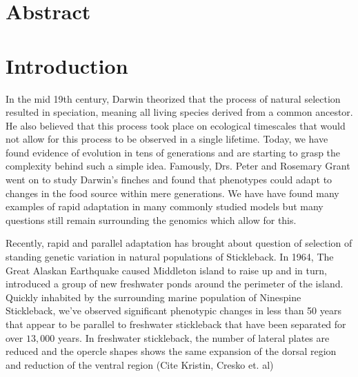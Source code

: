 \documentclass{article}
\begin{document}
\linespread{1.5}


\section{Abstract}









\section{Introduction}


In the mid 19th century,
Darwin theorized that the process of natural selection resulted in speciation, 
meaning all living species derived from a common ancestor. 
He also believed that this process took place on ecological timescales that would not allow for 
this process to be observed in a single lifetime. 
Today, we have found evidence of evolution
in tens of generations and are starting to grasp the complexity behind such a simple idea. 
Famously, Drs. Peter and Rosemary Grant went on to study Darwin's finches and
found that phenotypes could adapt to changes in the food source within mere generations.
We have have found many examples of rapid adaptation in many commonly studied models
but many questions still remain surrounding the genomics which allow for this.

Recently, rapid and parallel adaptation has brought about question of selection of
standing genetic variation in natural populations 
of Stickleback.
In 1964, The Great Alaskan Earthquake caused Middleton island to raise up and in turn, 
introduced a group of new freshwater ponds around the perimeter of the island. 
Quickly inhabited by the surrounding marine population of Ninespine Stickleback,
we've observed significant phenotypic changes in less than 50 years that appear to be 
parallel to freshwater stickleback that have been separated for over $13,000$ years. \cite{LescakE7204} 
In freshwater stickleback, 
the number of lateral plates are reduced
and the opercle shapes shows the same expansion of the dorsal region and reduction of the ventral region (Cite Kristin, Cresko et. al)
\end{document}
